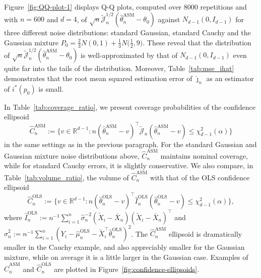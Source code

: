\documentclass[a4paper]{article}
\theoremstyle{definition}
\begin{document}
Figure~\ref{fig:QQ-plot-1} displays Q-Q plots, computed over 8000 repetitions and with $n = 600$ and $d = 4$, of $\sqrt{n}\tilde{\mathcal{J}}_n^{1/2} (\hat{\theta}_n^{\mathrm{ASM}} - \theta_0)$ against $N_{d-1}(0, I_{d-1})$ for three different noise distributions: standard Gaussian, standard Cauchy and the Gaussian mixture $P_0 = \frac{2}{3} N(0, 1) + \frac{1}{3} N\bigl(\frac{1}{2}, 9\bigr)$.  These reveal that the distribution of $\sqrt{n}\tilde{\mathcal{J}}_n^{1/2} (\hat{\theta}_n^{\mathrm{ASM}} - \theta_0)$ is well-approximated by that of $N_{d-1}(0, I_{d-1})$ even quite far into the tails of the distribution.  Moreover, Table~\ref{tab:mse_ihat} demonstrates that the root mean squared estimation error of $\hat{\jmath}_n$ as an estimator of $i^*(p_0)$ is small. 

In Table~\ref{tab:coverage_ratio}, we present coverage probabilities of the confidence ellipsoid 
\[
\hat{C}_n^{\mathrm{ASM}} := \bigl\{v \in \mathbb{R}^{d-1} : n (\hat{\theta}_n^{\mathrm{ASM}} - v)^\top \tilde{\mathcal{J}}_n (\hat{\theta}_n^{\mathrm{ASM}} - v) \leq \chi^2_{d-1}(\alpha) \bigr\}
\]
in the same settings as in the previous paragraph.  For the standard Gaussian and Gaussian mixture noise distributions above, $\hat{C}_n^{\mathrm{ASM}}$ maintains nominal coverage, while for standard Cauchy errors, it is slightly conservative.  We also compare, in Table~\ref{tab:volume_ratio}, the volume of $\hat{C}_n^{\mathrm{ASM}}$ with that of the OLS confidence ellipsoid
\[
\hat{C}_n^{\mathrm{OLS}} := \bigl\{v \in \mathbb{R}^{d-1} : n (\hat{\theta}_n^{\mathrm{OLS}} - v)^\top \hat{I}_n^{\mathrm{OLS}} (\hat{\theta}_n^{\mathrm{OLS}} - v) \leq \chi^2_{d-1}(\alpha)\bigr\},
\]
where $\hat{I}_n^{\mathrm{OLS}} := n^{-1}\sum_{i=1}^n \hat{\sigma}^{-2}_n(\tilde{X}_i - \bar{X}_n)(\tilde{X}_i - \bar{X}_n)^\top$ and $\hat{\sigma}_n^2 := n^{-1} \sum_{i=1}^n (Y_i  - \hat{\mu}^{\mathrm{OLS}}_n - \tilde{X}_i^\top \hat{\theta}_n^{\mathrm{OLS}})^2$.  The $\hat{C}_n^{\mathrm{ASM}}$ ellipsoid is dramatically smaller in the Cauchy example, and also appreciably smaller for the Gaussian mixture, while on average it is a little larger in the Gaussian case.  Examples of $\hat{C}_n^{\mathrm{ASM}}$ and $\hat{C}_n^{\mathrm{OLS}}$ are plotted in Figure~\ref{fig:confidence-ellipsoids}.
\end{document}
